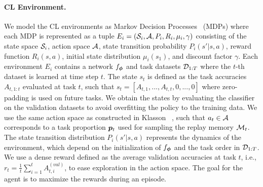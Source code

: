 \vspace{-3mm}
\paragraph{CL Environment.} We model the CL environments as Markov Decision Processes~ (MDPs) where each MDP is represented as a tuple $E_i = ({\mathcal{S}}_i, {\mathcal{A}}, P_i, R_i, \mu_i, \gamma)$ consisting of the state space ${\mathcal{S}}_i$, action space ${\mathcal{A}}$, state transition probability $P_i(s' | s, a)$, reward function $R_i(s, a)$, initial state distribution $\mu_i(s_1)$, and discount factor $\gamma$. 
Each environment $E_i$ contains a network $f_{{\bm{\phi}}}$ and task datasets ${\mathcal{D}}_{1:T}$ where the $t$-th dataset is learned at time step $t$.  
The state $s_t$ is defined as the task accuracies $A_{t,1:t}$ evaluated at task $t$, such that $s_t = [A_{t, 1}, ..., A_{t, t}, 0, ..., 0]$ where zero-padding is used on future tasks. We obtain the states by evaluating the classifier on the validation datasets to avoid overfitting the policy to the training data.
We use the same action space as constructed in Klasson \etal~, such that $a_t \in {\mathcal{A}}$ corresponds to a task proportion ${\bm{p}}_t$ used for sampling the replay memory ${\mathcal{M}}_t$. 
The state transition distribution $P_i(s' | s, a)$ represents the dynamics of the environment, which depend on the initialization of $f_{{\bm{\phi}}}$ and the task order in ${\mathcal{D}}_{1:T}$. 
We use a dense reward defined as the average validation accuracies at task $t$, i.e., $r_{t} = \frac{1}{t}\sum_{i=1}^{t} A_{t, i}^{(val)}$, to ease exploration in the action space. The goal for the agent is to maximize the rewards during an episode.


\vspace{-3mm}
